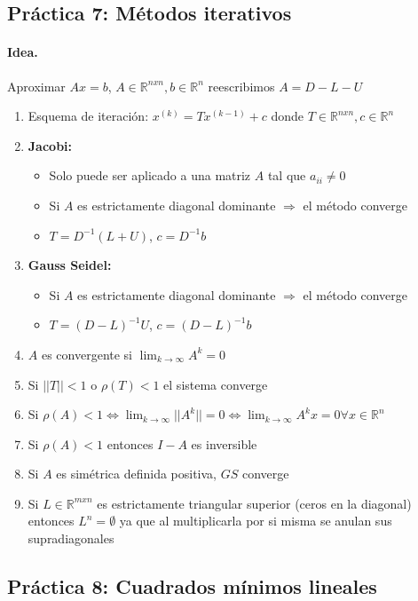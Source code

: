 \subsection*{Práctica 7: Métodos iterativos}
    \paragraph{Idea.} Aproximar $Ax=b$, $A\in \mathbb{R}^{nxn}, b\in\mathbb{R}^n$ reescribimos $A = D - L - U$
\begin{enumerate}
    \item Esquema de iteración: $x^{(k)} = Tx^{(k-1)} + c$ donde $T\in \mathbb{R}^{nxn}, c\in\mathbb{R}^n$
    \item \textbf{Jacobi:} 
    \begin{itemize}
        \item Solo puede ser aplicado a una matriz $A$ tal que $a_{ii}\neq0$
        \item Si $A$ es estrictamente diagonal dominante $\Rightarrow$ el método converge
        \item $T = D^{-1}(L+U)$, $c = D^{-1}b$
    \end{itemize}
    \item \textbf{Gauss Seidel:} 
    \begin{itemize}
        \item Si $A$ es estrictamente diagonal dominante $\Rightarrow$ el método converge
        \item $T = (D-L)^{-1}U$, $c = (D-L)^{-1}b$
    \end{itemize}
    \item $A$ es convergente si $\lim_{k \to \infty} A^k = 0$
    \item Si $||T|| < 1$ o $\rho(T) < 1$ el sistema converge
    \item Si $\rho(A) < 1 \iff \lim_{k \to \infty} ||A^k|| = 0 \iff \lim_{k \to \infty} A^kx = 0 \forall x \in \mathbb{R}^n$
    \item Si $\rho(A) < 1$ entonces $I-A$ es inversible
    \item Si $A$ es simétrica definida positiva, $GS$ converge

    \item Si $L \in \mathbb{R}^{mxn}$ es estrictamente triangular superior (ceros en la diagonal) entonces $L^n = \emptyset$ ya que al multiplicarla por si misma se anulan sus supradiagonales
\end{enumerate}

\subsection*{Práctica 8: Cuadrados mínimos lineales}

